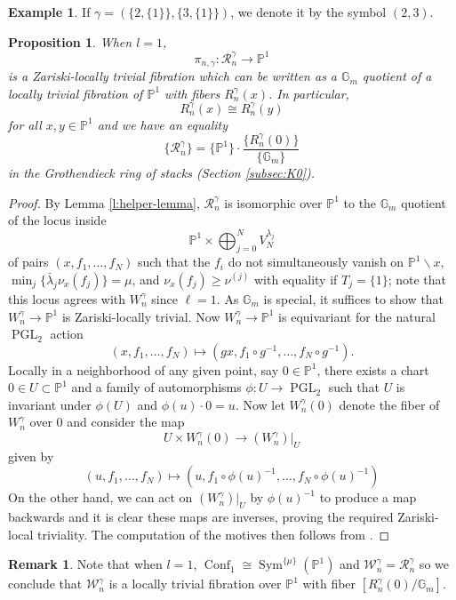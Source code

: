 \documentclass[a4paper,12pt]{amsart}
\newtheorem{prop}[thm]{Proposition}
\theoremstyle{definition}
\newtheorem{rmk}[thm]{Remark}
\newtheorem{exmp}[thm]{Example}
\newcommand{\bG}{\mathbb{G}}
\newcommand{\bP}{\mathbb{P}}
\newcommand{\cW}{\mathcal{W}}
\newcommand{\cR}{\mathcal{R}}
\DeclareMathOperator{\Conf}{Conf}
\DeclareMathOperator{\PGL}{PGL}
\DeclareMathOperator{\Sym}{Sym}
\renewcommand{\setminus}{\smallsetminus}
\begin{document}
	\begin{exmp} If $\gamma = ( \{2,\{1\}\}, \{3,\{1\}\} )$, we denote it by the symbol $(2, 3)$. \end{exmp}
	
	\begin{prop}\label{prop:single_addi} When $l = 1$,
		$$
		\pi_{n,\gamma} : \cR^\gamma_n \to \bP^1
		$$
		is a Zariski-locally trivial fibration which can be written as a $\bG_m$ quotient of a locally trivial fibration of $\bP^1$ with fibers $R^\gamma_n(x)$. In particular, 
		$$
		R^\gamma_n(x) \cong R^\gamma_n(y)
		$$
		for all $x, y \in \bP^1$ and we have an equality
		$$
		\{\cR^\gamma_n\}=\{\bP^1\}\cdot\frac{\{R^\gamma_n(0)\}}{\{\bG_m\}}
		$$
		in the Grothendieck ring of stacks (Section \ref{subsec:K0}).
	\end{prop}
	\begin{proof} By Lemma \ref{l:helper-lemma}, $\cR^\gamma_n$ is isomorphic over $\bP^1$ to the $\mathbb{G}_m$ quotient of the locus inside
		$$
		\bP^1 \times \bigoplus_{j = 0}^N V^{\lambda_j}_N
		$$
		of pairs $(x, f_1, \ldots, f_N)$ such that the $f_i$ do not simultaneously vanish on $\bP^1 \setminus x$, $\min_j \{\bar{\lambda}_j \nu_x(f_j)\} = \mu$, and $\nu_x(f_j) \geq \nu^{(j)}$ with equality if $T_j = \{1\}$; note that this locus agrees with $W^\gamma_n$ since $\ell=1$. As $\bG_m$ is special, it suffices to show that $W^\gamma_n \to \bP^1$ is Zariski-locally trivial. Now $W^\gamma_n \to \bP^1$ is equivariant for the natural $\PGL_2$ action 
		$$
		(x, f_1, \ldots, f_N) \mapsto (gx, f_1\circ g^{-1}, \ldots, f_N \circ g^{-1}). 
		$$
		Locally in a neighborhood of any given point, say $0 \in \bP^1$, there exists a chart $0 \in U \subset \bP^1$ and a family of automorphisms $\phi : U \to \PGL_2$ such that $U$ is invariant under $\phi(U)$ and $\phi(u)\cdot 0 = u$. Now let $W^\gamma_n(0)$ denote the fiber of $W^\gamma_n$ over $0$ and consider the map
		$$
		U \times W^\gamma_n(0) \to (W^\gamma_n)|_U
		$$
		given by
		$$
		(u, f_1, \ldots, f_N) \mapsto (u, f_1 \circ \phi(u)^{-1}, \ldots, f_N \circ \phi(u)^{-1})
		$$
		On the other hand, we can act on $(W^\gamma_n)|_U$ by $\phi(u)^{-1}$ to produce a map backwards and it is clear these maps are inverses, proving the required Zariski-local triviality. The computation of the motives then follows from \cite[Prop. 1.1 iii), 1.4]{Ekedahl}.
	\end{proof}
	
	\begin{rmk} Note that when $l = 1$, $\Conf_1 \cong \Sym^{\{\mu\}}(\bP^1)$ and $\cW^\gamma_n = \cR^\gamma_n$ so we conclude that $\cW^\gamma_n$ is a locally trivial fibration over $\bP^1$ with fiber $\left[R^\gamma_n(0)/\bG_m\right]$. 
	\end{rmk}
	
\end{document}
